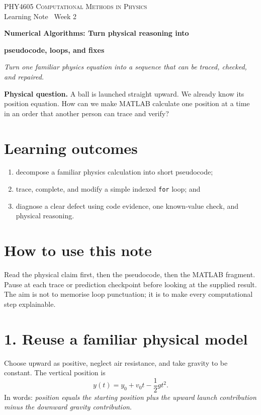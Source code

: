 \documentclass[11pt,a4paper]{article}
\newcommand{\course}{PHY4605 Computational Methods in Physics}
\begin{document}
{\large\textsc{\course}}\\[-2pt]
{\small Learning Note \textbar\ Week 2}\par\vspace{4pt}
{\LARGE\bfseries Numerical Algorithms: Turn physical reasoning into}\par\vspace{-1pt}
{\LARGE\bfseries pseudocode, loops, and fixes}\par\vspace{3pt}
\textit{Turn one familiar physics equation into a sequence that can be traced, checked, and repaired.}

\begin{keybox}\textbf{Physical question.} A ball is launched straight upward. We already know its position equation. How can we make MATLAB calculate one position at a time in an order that another person can trace and verify?\end{keybox}

\section*{Learning outcomes}
\begin{enumerate}[nosep,leftmargin=5mm]
\item decompose a familiar physics calculation into short pseudocode;
\item trace, complete, and modify a simple indexed \texttt{for} loop; and
\item diagnose a clear defect using code evidence, one known-value check, and physical reasoning.
\end{enumerate}

\section*{How to use this note}
Read the physical claim first, then the pseudocode, then the MATLAB fragment. Pause at each trace or prediction checkpoint before looking at the supplied result. The aim is not to memorise loop punctuation; it is to make every computational step explainable.

\section*{1. Reuse a familiar physical model}
Choose upward as positive, neglect air resistance, and take gravity to be constant. The vertical position is
\[
y(t)=y_0+v_0t-\frac{1}{2}gt^2.
\]
In words: \emph{position equals the starting position plus the upward launch contribution minus the downward gravity contribution}.
\end{document}
